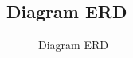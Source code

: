 \begin{figure}[H]
    \centering
\end{figure}


\subsection{Diagram ERD}
\begin{figure}[H]
    \centering
    \caption{Diagram ERD}
\end{figure}